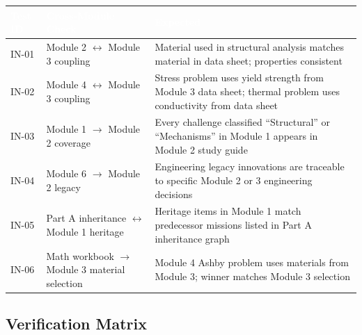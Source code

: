 \documentclass[11pt,letterpaper]{article}
\newcommand{\tableheader}[1]{\textbf{\sffamily\textcolor{white}{#1}}}
\begin{document}
\begin{center}
\begin{tabularx}{\textwidth}{L{1.5cm}L{4cm}X}
\toprule
{}
\tableheader{Test ID} & \tableheader{Cross-Module Check} & \tableheader{Expected} \\
\midrule
IN-01 & Module 2 $\leftrightarrow$ Module 3 coupling & Material used in structural analysis matches material in data sheet; properties consistent \\
IN-02 & Module 4 $\leftrightarrow$ Module 3 coupling & Stress problem uses yield strength from Module 3 data sheet; thermal problem uses conductivity from data sheet \\
IN-03 & Module 1 $\to$ Module 2 coverage & Every challenge classified ``Structural'' or ``Mechanisms'' in Module 1 appears in Module 2 study guide \\
IN-04 & Module 6 $\to$ Module 2 legacy & Engineering legacy innovations are traceable to specific Module 2 or 3 engineering decisions \\
IN-05 & Part A inheritance $\leftrightarrow$ Module 1 heritage & Heritage items in Module 1 match predecessor missions listed in Part A inheritance graph \\
IN-06 & Math workbook $\to$ Module 3 material selection & Module 4 Ashby problem uses materials from Module 3; winner matches Module 3 selection \\
\bottomrule
\end{tabularx}
\end{center}

\subsection{Verification Matrix}
\end{document}
